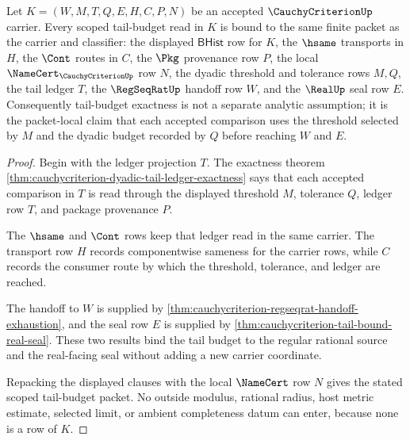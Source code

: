 \begin{theorem}
\label{thm:cauchycriterion-tail-budget-scope}
Let $K=(W,M,T,Q,E,H,C,P,N)$ be an accepted $\CauchyCriterionUp$ carrier. Every scoped tail-budget read in $K$ is bound to the same finite packet as the carrier and classifier: the displayed $\mathsf{BHist}$ row for $K$, the $\hsame$ transports in $H$, the $\Cont$ routes in $C$, the $\Pkg$ provenance row $P$, the local $\NameCert_{\CauchyCriterionUp}$ row $N$, the dyadic threshold and tolerance rows $M,Q$, the tail ledger $T$, the $\RegSeqRatUp$ handoff row $W$, and the $\RealUp$ seal row $E$. Consequently tail-budget exactness is not a separate analytic assumption; it is the packet-local claim that each accepted comparison uses the threshold selected by $M$ and the dyadic budget recorded by $Q$ before reaching $W$ and $E$.
\end{theorem}
\begin{proof}
Begin with the ledger projection $T$. The exactness theorem \autoref{thm:cauchycriterion-dyadic-tail-ledger-exactness} says that each accepted comparison in $T$ is read through the displayed threshold $M$, tolerance $Q$, ledger row $T$, and package provenance $P$.

The $\hsame$ and $\Cont$ rows keep that ledger read in the same carrier. The transport row $H$ records componentwise sameness for the carrier rows, while $C$ records the consumer route by which the threshold, tolerance, and ledger are reached.

The handoff to $W$ is supplied by \autoref{thm:cauchycriterion-regseqrat-handoff-exhaustion}, and the seal row $E$ is supplied by \autoref{thm:cauchycriterion-tail-bound-real-seal}. These two results bind the tail budget to the regular rational source and the real-facing seal without adding a new carrier coordinate.

Repacking the displayed clauses with the local $\NameCert$ row $N$ gives the stated scoped tail-budget packet. No outside modulus, rational radius, host metric estimate, selected limit, or ambient completeness datum can enter, because none is a row of $K$.
\end{proof}

